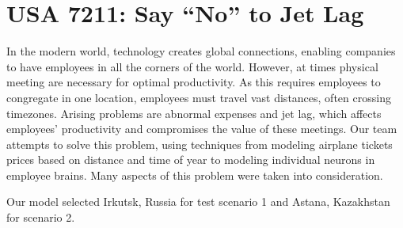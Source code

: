 \section*{USA 7211: Say ``No'' to Jet Lag}
In the modern world, technology creates global connections, enabling companies to have employees in all the corners of the world. However, at times physical meeting are necessary for optimal productivity. As this requires employees to congregate in one location, employees must travel vast distances, often crossing timezones. Arising problems are abnormal expenses and jet lag, which affects employees' productivity and compromises the value of these meetings. Our team attempts to solve this problem, using techniques from modeling airplane tickets prices based on distance and time of year to modeling individual neurons in employee brains. Many aspects of this problem were taken into consideration.


Our model selected Irkutsk, Russia for test scenario 1 and Astana, Kazakhstan for scenario 2.
